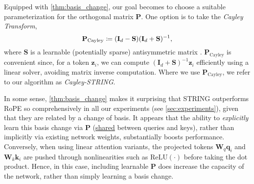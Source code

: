 Equipped with \cref{thm:basis_change}, our goal becomes to choose a suitable parameterization for the orthogonal matrix $\mathbf{P}$.
One option is to take the \emph{Cayley Transform}, \vspace{-2mm}
\begin{equation} \label{eq:cayley_string}
    \mathbf{P}_\textrm{Cayley} \coloneqq (\mathbf{I}_d - \mathbf{S})(\mathbf{I}_d + \mathbf{S})^{-1},\vspace{-0mm}
\end{equation} 
where $\mathbf{S}$ is a learnable (potentially sparse) antisymmetric matrix \citep{DieleLP98}.
$\mathbf{P}_\textrm{Cayley}$ is convenient since, for a token $\mathbf{z}_i$, we can compute $(\mathbf{I}_d + \mathbf{S})^{-1}\mathbf{z}_i$ efficiently using a linear solver, avoiding matrix inverse computation.
Where we use $\mathbf{P}_\textrm{Cayley}$, we refer to our algorithm as \emph{Cayley-STRING}.

In some sense, \cref{thm:basis_change} makes it surprising that STRING outperforms RoPE so comprehensively in all our experiments (see \cref{sec:experiments}), given that they are related by a change of basis.
It appears that the ability to \emph{explicitly} learn this basis change via $\mathbf{P}$ (\underline{shared} between queries and keys), rather than implicitly via existing network weights, substantially boosts performance. 
Conversely, when using linear attention variants, the projected tokens $\mathbf{W}_q\mathbf{q}_i$ and $\mathbf{W}_k\mathbf{k}_i$ are pushed through nonlinearities such as $\textrm{ReLU}(\cdot)$ before taking the dot product.
Hence, in this case, including learnable $\mathbf{P}$ does increase the capacity of the network, rather than simply learning a basis change.

